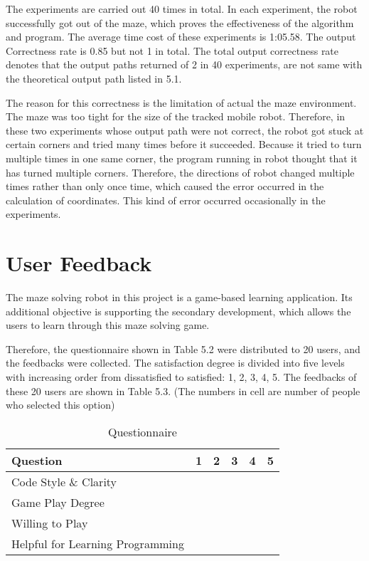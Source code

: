 \documentclass[11pt,times,oneside,openright,hardcopy]{eeereport}
\begin{document}
The experiments are carried out 40 times in total.
In each experiment, the robot successfully got out of the maze, which proves the effectiveness of the algorithm and program.
The average time cost of these experiments is 1:05.58. The output Correctness rate is 0.85 but not 1 in total.
The total output correctness rate denotes that the output paths returned of 2 in 40 experiments, are not same with the theoretical output path listed in 5.1.

The reason for this correctness is the limitation of actual the maze environment. The maze was too tight for the size of the tracked mobile robot.
Therefore, in these two experiments whose output path were not correct, the robot got stuck at certain corners and tried many times before it succeeded.
Because it tried to turn multiple times in one same corner, the program running in robot thought that it has turned multiple corners. 
Therefore, the directions of robot changed multiple times rather than only once time, which caused the error occurred in the calculation of coordinates.
This kind of error occurred occasionally in the experiments.
\section{User Feedback}
The maze solving robot in this project is a game-based learning application. Its additional objective is supporting the secondary development,
which allows the users to learn through this maze solving game.

Therefore, the questionnaire shown in Table 5.2 were distributed to 20 users, and the feedbacks were collected.
The satisfaction degree is divided into five levels with increasing order from dissatisfied to satisfied: 1, 2, 3, 4, 5.
The feedbacks of these 20 users are shown in Table 5.3. (The numbers in cell are number of people who selected this option)
\begin{table}[h]
    \label{tab:tab1}
    \centering
    \caption{Questionnaire}
    \renewcommand{\arraystretch}{2}
    \setlength{\tabcolsep}{10pt}
    \begin{tabular}{ | m{8cm} | m{0.5cm} | m{0.5cm} | m{0.5cm} | m{0.5cm} | m{0.5cm} |} 
    \hline Question & 1 & 2 & 3 & 4 & 5\\
    \hline Code Style \& Clarity &  &  &  &  & \\
    \hline Game Play Degree  &  &  &  &  & \\
    \hline Willing to Play   &  &  &  &  & \\
    \hline Helpful for Learning Programming &  &  &  &  & \\
    \hline  
    \end{tabular} 
    \end{table}
\end{document}
